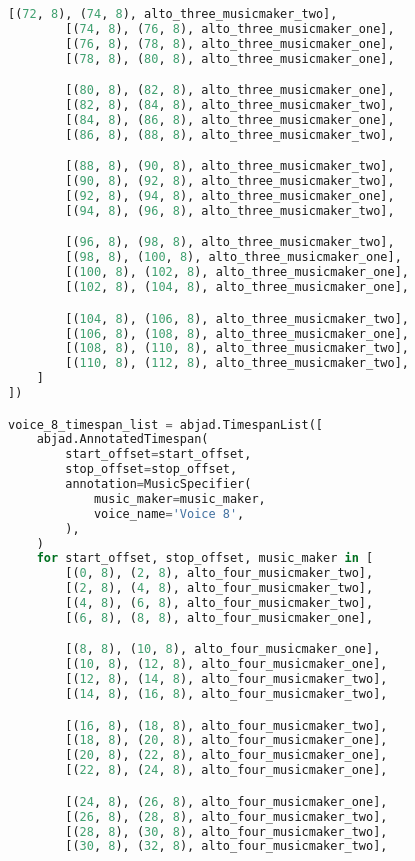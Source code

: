 \begin{lstlisting}[language=Python, caption=Invocation Source Code]
        [(72, 8), (74, 8), alto_three_musicmaker_two],
        [(74, 8), (76, 8), alto_three_musicmaker_one],
        [(76, 8), (78, 8), alto_three_musicmaker_one],
        [(78, 8), (80, 8), alto_three_musicmaker_one],

        [(80, 8), (82, 8), alto_three_musicmaker_one],
        [(82, 8), (84, 8), alto_three_musicmaker_two],
        [(84, 8), (86, 8), alto_three_musicmaker_one],
        [(86, 8), (88, 8), alto_three_musicmaker_two],

        [(88, 8), (90, 8), alto_three_musicmaker_two],
        [(90, 8), (92, 8), alto_three_musicmaker_two],
        [(92, 8), (94, 8), alto_three_musicmaker_one],
        [(94, 8), (96, 8), alto_three_musicmaker_two],

        [(96, 8), (98, 8), alto_three_musicmaker_two],
        [(98, 8), (100, 8), alto_three_musicmaker_one],
        [(100, 8), (102, 8), alto_three_musicmaker_one],
        [(102, 8), (104, 8), alto_three_musicmaker_one],

        [(104, 8), (106, 8), alto_three_musicmaker_two],
        [(106, 8), (108, 8), alto_three_musicmaker_one],
        [(108, 8), (110, 8), alto_three_musicmaker_two],
        [(110, 8), (112, 8), alto_three_musicmaker_two],
    ]
])

voice_8_timespan_list = abjad.TimespanList([
    abjad.AnnotatedTimespan(
        start_offset=start_offset,
        stop_offset=stop_offset,
        annotation=MusicSpecifier(
            music_maker=music_maker,
            voice_name='Voice 8',
        ),
    )
    for start_offset, stop_offset, music_maker in [
        [(0, 8), (2, 8), alto_four_musicmaker_two],
        [(2, 8), (4, 8), alto_four_musicmaker_two],
        [(4, 8), (6, 8), alto_four_musicmaker_two],
        [(6, 8), (8, 8), alto_four_musicmaker_one],

        [(8, 8), (10, 8), alto_four_musicmaker_one],
        [(10, 8), (12, 8), alto_four_musicmaker_one],
        [(12, 8), (14, 8), alto_four_musicmaker_two],
        [(14, 8), (16, 8), alto_four_musicmaker_two],

        [(16, 8), (18, 8), alto_four_musicmaker_two],
        [(18, 8), (20, 8), alto_four_musicmaker_one],
        [(20, 8), (22, 8), alto_four_musicmaker_one],
        [(22, 8), (24, 8), alto_four_musicmaker_one],

        [(24, 8), (26, 8), alto_four_musicmaker_one],
        [(26, 8), (28, 8), alto_four_musicmaker_two],
        [(28, 8), (30, 8), alto_four_musicmaker_two],
        [(30, 8), (32, 8), alto_four_musicmaker_two],


\end{lstlisting}

